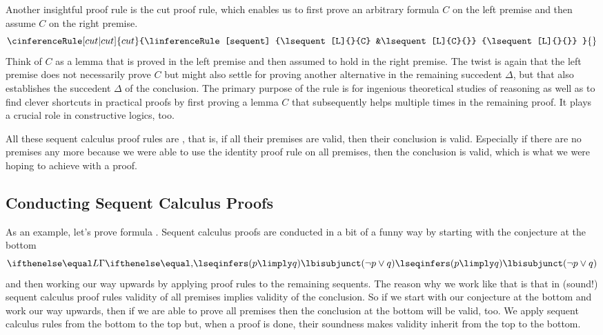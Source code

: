\documentclass[11pt,twoside]{scrartcl}
\newcommand{\cusfml}{C}
\begin{document}
Another insightful proof rule is the cut proof rule, which enables us to first prove an arbitrary formula $\cusfml$ on the left premise and then assume $\cusfml$ on the right premise.
\[
\cinferenceRule[cut|cut]{cut}
{\linferenceRule[sequent]
  {\lsequent[L]{}{\cusfml}
  &\lsequent[L]{\cusfml}{}}
  {\lsequent[L]{}{}}
}{}%
\]
Think of $\cusfml$ as a lemma that is proved in the left premise and then assumed to hold in the right premise.
The twist is again that the left premise does not necessarily prove $\cusfml$ but might also settle for proving another alternative in the remaining succedent $\Delta$, but that also establishes the succedent $\Delta$ of the conclusion.
The primary purpose of the  rule is for ingenious theoretical studies of reasoning \cite{Gentzen35I} as well as to find clever shortcuts in practical proofs by first proving a lemma $\cusfml$ that subsequently helps multiple times in the remaining proof.
It plays a crucial role in constructive logics, too.

All these sequent calculus proof rules are , that is, if all their premises are valid, then their conclusion is valid.
Especially if there are no premises any more because we were able to use the identity proof rule  on all premises, then the conclusion is valid, which is what we were hoping to achieve with a proof.


\subsection{Conducting Sequent Calculus Proofs}

As an example, let's prove formula .
Sequent calculus proofs are conducted in a bit of a funny way by starting with the conjecture at the bottom
\[
{\lsequent{} {(p \limply q) \lbisubjunct (\lnot p \lor q)}}
\]
and then working our way upwards by applying proof rules to the remaining sequents.
The reason why we work like that is that in (sound!) sequent calculus proof rules validity of all premises implies validity of the conclusion.
So if we start with our conjecture at the bottom and work our way upwards, then if we are able to prove all premises then the conclusion at the bottom will be valid, too.
We apply sequent calculus rules from the bottom to the top but, when a proof is done, their soundness makes validity inherit from the top to the bottom.
\end{document}
